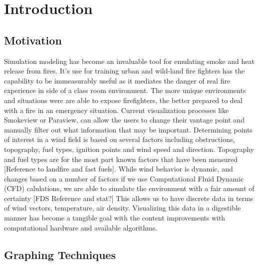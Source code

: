 
\chapter{Introduction} %

\label{ChapterX} %


\section{Motivation}

Simulation modeling has become an invaluable tool for emulating smoke and heat release from fires. It’s use for training urban and wild-land fire fighters has the capability to be immeasurably useful as it mediates the danger of real fire experience in side of a class room environment. The more unique environments and situations were are able to expose firefighters, the better prepared to deal with a fire in an emergency situation. Current visualization processes like Smokeview or Paraview, can allow the users to change their vantage point and manually filter out what information that may be important. Determining points of interest in a wind field is based on several factors including obstructions, topography, fuel types, ignition points and wind speed and direction. Topography and fuel types are for the most part known factors that have been measured [Reference to landfire and fast fuels]. While wind behavior is dynamic, and changes based on a number of factors if we use Computational Fluid Dynamic (CFD) calulations, we are able to simulate the environment with a fair amount of certainty [FDS Reference and stat?] This allows us to have discrete data in terms of wind vectors, temperature, air density. Visualizing this data in a digestible manner has become a tangible goal with the content improvements with computational hardware and available algorithms. 



\section{Graphing Techniques}

